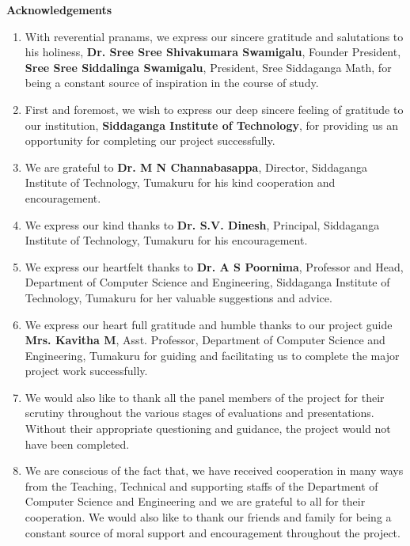 \documentclass[oneside,12pt]{Classes/VTU}
\begin{document}
	\pagebreak
	\begin{center}
		\textbf{\LARGE{Acknowledgements}}
	\end{center}
	\begin{enumerate}[]
		\item With reverential pranams, we express our sincere gratitude and salutations to his holiness, \textbf{Dr. Sree Sree Shivakumara Swamigalu}, Founder President, \textbf{Sree Sree Siddalinga Swamigalu}, President, Sree Siddaganga Math, for being a constant source of inspiration in the course of study.
		\item First and foremost, we wish to express our deep sincere feeling of gratitude to our institution, \textbf{Siddaganga Institute of Technology}, for providing us an opportunity for completing our project successfully.
		\item We are grateful to \textbf{Dr. M N Channabasappa}, Director, Siddaganga Institute of Technology, Tumakuru for his kind cooperation and encouragement.
		\item We express our kind thanks to \textbf{Dr. S.V. Dinesh}, Principal, Siddaganga Institute of Technology, Tumakuru for his encouragement.
		\item We express our heartfelt thanks to \textbf{Dr. A S Poornima}, Professor and Head, Department of Computer Science and Engineering, Siddaganga Institute of Technology, Tumakuru for her valuable suggestions and advice.
		\item We express our heart full gratitude and humble thanks to our project guide \textbf{Mrs. Kavitha M}, Asst. Professor, Department of Computer Science and Engineering, Tumakuru for guiding and facilitating us to complete the major project work successfully.
		\item We would also like to thank all the panel members of the project for their scrutiny throughout the various stages of evaluations and presentations. Without their appropriate questioning and guidance, the project would not have been completed.
		\item We are conscious of the fact that, we have received cooperation in many ways from the Teaching, Technical and supporting staffs of the Department of Computer Science and Engineering and we are grateful to all for their cooperation. We would also like to thank our friends and family for being a constant source of moral support and encouragement throughout the project.
	\end{enumerate}
	
\end{document}
